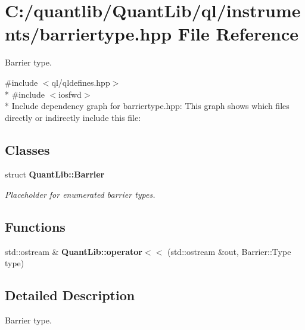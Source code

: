 \section{C\+:/quantlib/\+Quant\+Lib/ql/instruments/barriertype.hpp File Reference}
\label{barriertype_8hpp}


Barrier type.  


{\ttfamily \#include $<$ql/qldefines.\+hpp$>$}\\*
{\ttfamily \#include $<$iosfwd$>$}\\*
Include dependency graph for barriertype.\+hpp\+:
This graph shows which files directly or indirectly include this file\+:
\subsection*{Classes}
\begin{DoxyCompactItemize}
\item 
struct {\bf Quant\+Lib\+::\+Barrier}
\begin{DoxyCompactList}\small\item\em Placeholder for enumerated barrier types. \end{DoxyCompactList}\end{DoxyCompactItemize}
\subsection*{Functions}
\begin{DoxyCompactItemize}
\item 
std\+::ostream \& {\bfseries Quant\+Lib\+::operator$<$$<$} (std\+::ostream \&out, Barrier\+::\+Type type)\label{barriertype_8cpp_a179152ff86fc6fbd23e27378b78ad687}

\end{DoxyCompactItemize}


\subsection{Detailed Description}
Barrier type. 

